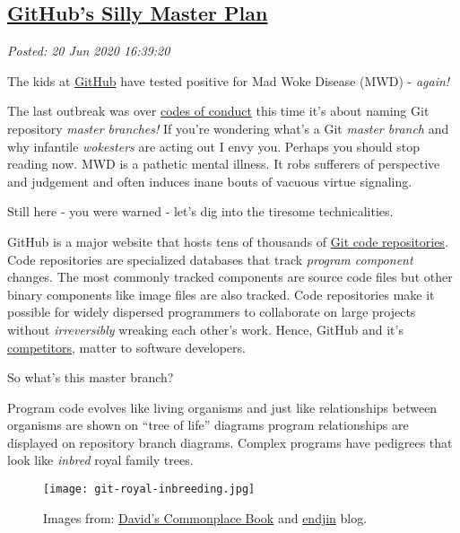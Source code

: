 %

\subsection*{\href{https://analyzethedatanotthedrivel.org/2020/06/20/githubs-silly-master-plan/}{GitHub's Silly Master Plan}}


\noindent\emph{Posted: 20 Jun 2020 16:39:20}
\vspace{6pt}

The kids at \href{https://github.com/}{GitHub} have tested positive for
Mad Woke Disease (MWD) - \emph{again!}

The last outbreak was over
\href{https://forums.theregister.com/forum/all/2018/10/22/sqlite_code_of_conduct/}{codes
of conduct} this time it's about naming Git repository \emph{master
branches!} If you're wondering what's a Git \emph{master branch} and why
infantile \emph{wokesters} are acting out I envy you. Perhaps you should
stop reading now. MWD is a pathetic mental illness. It robs sufferers of
perspective and judgement and often induces inane bouts of vacuous
virtue signaling.

Still here - you were warned - let's dig into the tiresome
technicalities.

GitHub is a major website that hosts tens of thousands of
\href{https://git-scm.com/}{Git code repositories}. Code repositories
are specialized databases that track \emph{program component} changes.
The most commonly tracked components are source code files but other
binary components like image files are also tracked. Code repositories
make it possible for widely dispersed programmers to collaborate on
large projects without \emph{irreversibly} wreaking each other's work.
Hence, GitHub and it's \href{https://bitbucket.org/}{competitors},
matter to software developers.

So what's this master branch?

Program code evolves like living organisms and just like relationships
between organisms are shown on ``tree of life'' diagrams program
relationships are displayed on repository branch diagrams. Complex
programs have pedigrees that look like \emph{inbred} royal family trees.


\captionsetup[figure]{labelformat=empty}
\begin{figure}[htbp]
\centering
\texttt{[image: git-royal-inbreeding.jpg]}
\caption{Images from: \href{https://davidscommonplacebook.wordpress.com/}{David's Commonplace
Book} and \href{https://endjin.com/blog/}{endjin} blog.}
\label{fig:5835x0}
\end{figure}

